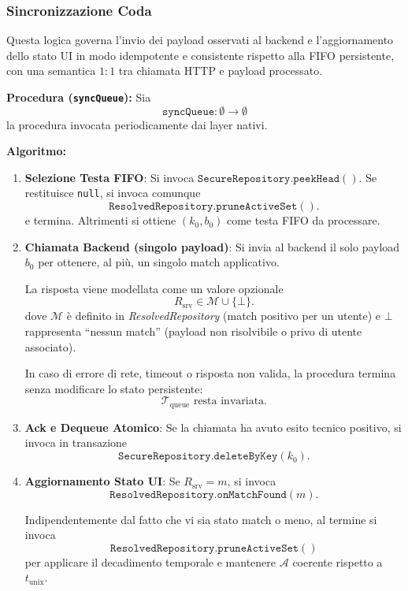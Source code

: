 \documentclass[a4paper,11pt,table,dvipsnames]{article}
\begin{document}
\subsubsection{Sincronizzazione Coda}
Questa logica governa l’invio dei payload osservati al backend e l’aggiornamento dello stato UI in modo idempotente e consistente rispetto alla FIFO persistente, con una semantica \(1{:}1\) tra chiamata HTTP e payload processato.

\textbf{Procedura (\texttt{syncQueue}):}
Sia
\[
    \texttt{syncQueue}: \emptyset \rightarrow \emptyset
\]
la procedura invocata periodicamente dai layer nativi.

\textbf{Algoritmo:}
\begin{enumerate}
    \item \textbf{Selezione Testa FIFO}:
          Si invoca \(\texttt{SecureRepository.peekHead}()\).
          Se restituisce \texttt{null}, si invoca comunque
          \[
              \texttt{ResolvedRepository.pruneActiveSet}().
          \]
          e termina.
          Altrimenti si ottiene \((k_0,b_0)\) come testa FIFO da processare.

    \item \textbf{Chiamata Backend (singolo payload)}:
          Si invia al backend il solo payload \(b_0\) per ottenere, al più, un singolo match applicativo.

          La risposta viene modellata come un valore opzionale
          \[
              R_{\text{srv}} \in \mathcal{M} \cup \{\bot\}.
          \]
          dove \(\mathcal{M}\) è definito in \emph{ResolvedRepository} (match positivo per un utente) e \(\bot\) rappresenta “nessun match” (payload non risolvibile o privo di utente associato).

          In caso di errore di rete, timeout o risposta non valida, la procedura termina senza modificare lo stato persistente:
          \[
              \mathcal{T}_{\text{queue}} \text{ resta invariata.}
          \]

    \item \textbf{Ack e Dequeue Atomico}:
          Se la chiamata ha avuto esito tecnico positivo, si invoca in transazione
          \[
              \texttt{SecureRepository.deleteByKey}(k_0).
          \]

    \item \textbf{Aggiornamento Stato UI}:
          Se \(R_{\text{srv}} = m\), si invoca
          \[
              \texttt{ResolvedRepository.onMatchFound}(m).
          \]

          Indipendentemente dal fatto che vi sia stato match o meno, al termine si invoca
          \[
              \texttt{ResolvedRepository.pruneActiveSet}()
          \]
          per applicare il decadimento temporale e mantenere \(\mathcal{A}\) coerente rispetto a \(t_{\text{unix}}\).
\end{enumerate}
\end{document}
